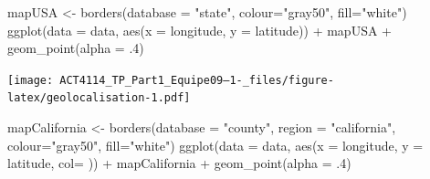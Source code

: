 \documentclass[
]{article}
\newenvironment{Shaded}{\begin{snugshade}}{\end{snugshade}}
\newcommand{\AttributeTok}[1]{\textcolor[rgb]{0.77,0.63,0.00}{#1}}
\newcommand{\ControlFlowTok}[1]{\textcolor[rgb]{0.13,0.29,0.53}{\textbf{#1}}}
\newcommand{\DecValTok}[1]{\textcolor[rgb]{0.00,0.00,0.81}{#1}}
\newcommand{\FunctionTok}[1]{\textcolor[rgb]{0.00,0.00,0.00}{#1}}
\newcommand{\NormalTok}[1]{#1}
\newcommand{\OtherTok}[1]{\textcolor[rgb]{0.56,0.35,0.01}{#1}}
\newcommand{\SpecialCharTok}[1]{\textcolor[rgb]{0.00,0.00,0.00}{#1}}
\newcommand{\StringTok}[1]{\textcolor[rgb]{0.31,0.60,0.02}{#1}}
\begin{document}
\begin{Shaded}
\end{Shaded}

\begin{Shaded}
\begin{Highlighting}[]
\NormalTok{mapUSA }\OtherTok{\textless{}{-}} \FunctionTok{borders}\NormalTok{(}\AttributeTok{database =} \StringTok{"state"}\NormalTok{, }
                  \AttributeTok{colour=}\StringTok{"gray50"}\NormalTok{, }\AttributeTok{fill=}\StringTok{"white"}\NormalTok{)}
\FunctionTok{ggplot}\NormalTok{(}\AttributeTok{data =}\NormalTok{ data, }\FunctionTok{aes}\NormalTok{(}\AttributeTok{x =}\NormalTok{ longitude, }\AttributeTok{y =}\NormalTok{ latitude)) }\SpecialCharTok{+}
\NormalTok{    mapUSA }\SpecialCharTok{+} \FunctionTok{geom\_point}\NormalTok{(}\AttributeTok{alpha =}\NormalTok{ .}\DecValTok{4}\NormalTok{)}
\end{Highlighting}
\end{Shaded}

\texttt{[image: ACT4114\_TP\_Part1\_Equipe09--1-\_files/figure-latex/geolocalisation-1.pdf]}

\begin{Shaded}
\begin{Highlighting}[]
\NormalTok{mapCalifornia }\OtherTok{\textless{}{-}} \FunctionTok{borders}\NormalTok{(}\AttributeTok{database =} \StringTok{"county"}\NormalTok{, }\AttributeTok{region =} \StringTok{"california"}\NormalTok{,}
                  \AttributeTok{colour=}\StringTok{"gray50"}\NormalTok{, }\AttributeTok{fill=}\StringTok{"white"}\NormalTok{)}
\FunctionTok{ggplot}\NormalTok{(}\AttributeTok{data =}\NormalTok{ data, }\FunctionTok{aes}\NormalTok{(}\AttributeTok{x =}\NormalTok{ longitude, }\AttributeTok{y =}\NormalTok{ latitude, }\AttributeTok{col=}\NormalTok{ )) }\SpecialCharTok{+}
\NormalTok{    mapCalifornia }\SpecialCharTok{+} \FunctionTok{geom\_point}\NormalTok{(}\AttributeTok{alpha =}\NormalTok{ .}\DecValTok{4}\NormalTok{)  }
\end{Highlighting}
\end{Shaded}
\end{document}
